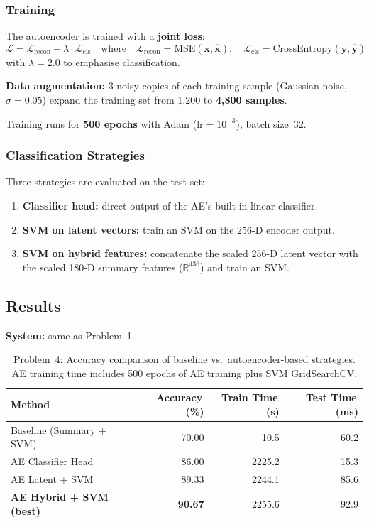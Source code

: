 \documentclass[12pt, a4paper]{article}
\renewcommand{\arraystretch}{1.12}
\begin{document}
\subsubsection{Training}

The autoencoder is trained with a \textbf{joint loss}:
\[
    \mathcal{L} = \mathcal{L}_{\text{recon}} + \lambda \cdot \mathcal{L}_{\text{cls}}
    \quad\text{where}\quad
    \mathcal{L}_{\text{recon}} = \text{MSE}(\mathbf{x}, \hat{\mathbf{x}}),\quad
    \mathcal{L}_{\text{cls}} = \text{CrossEntropy}(\mathbf{y}, \hat{\mathbf{y}})
\]
with $\lambda = 2.0$ to emphasise classification.

\textbf{Data augmentation:} 3 noisy copies of each training sample (Gaussian noise,
$\sigma = 0.05$) expand the training set from 1{,}200 to \textbf{4{,}800 samples}.

Training runs for \textbf{500 epochs} with Adam ($\text{lr} = 10^{-3}$), batch size~32.

\subsubsection{Classification Strategies}

Three strategies are evaluated on the test set:
\begin{enumerate}[label=\textbf{\Alph*.}]
    \item \textbf{Classifier head:} direct output of the AE's built-in linear classifier.
    \item \textbf{SVM on latent vectors:} train an SVM on the 256-D encoder output.
    \item \textbf{SVM on hybrid features:} concatenate the scaled 256-D latent vector
          with the scaled 180-D summary features ($\mathbb{R}^{436}$) and train an SVM.
\end{enumerate}

\subsection{Results}

\textbf{System:} same as Problem~1.

\begin{table}[H]
\centering
\renewcommand{\arraystretch}{1.3}
\begin{tabular}{l r r r}
\toprule
\textbf{Method} & \textbf{Accuracy\,(\%)} & \textbf{Train Time\,(s)} & \textbf{Test Time\,(ms)} \\
\midrule
Baseline (Summary + SVM)        & 70.00  & 10.5   & 60.2  \\
AE Classifier Head              & 86.00  & 2225.2 & 15.3  \\
AE Latent + SVM                 & 89.33  & 2244.1 & 85.6  \\
\textbf{AE Hybrid + SVM (best)} & \textbf{90.67} & 2255.6 & 92.9 \\
\bottomrule
\end{tabular}
\caption{Problem~4: Accuracy comparison of baseline vs.\ autoencoder-based strategies.
         AE training time includes 500 epochs of AE training plus SVM GridSearchCV.}
\label{tab:prob4_results}
\end{table}
\end{document}
